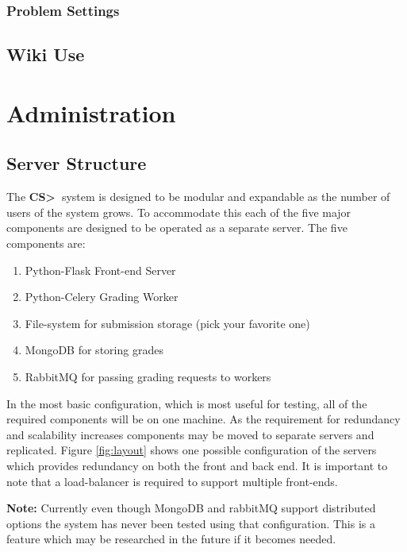 \documentclass[11pt]{report}
\newcommand{\csgt}[0]{\textbf{CS\textgreater\ }}
\begin{document}
\subsection{Problem Settings}




\section{Wiki Use}
\label{sec:wiki}


\chapter{Administration}
\label{ch:admin}
\section{Server Structure}
The \csgt system is designed to be modular and expandable as the number of users of the system grows. 
To accommodate this each of the five major components are designed to be operated as a separate server. 
The five components are:

\begin{enumerate}
\item Python-Flask Front-end Server
\item Python-Celery Grading Worker
\item File-system for submission storage (pick your favorite one)
\item MongoDB for storing grades
\item RabbitMQ for passing grading requests to workers
\end{enumerate}

In the most basic configuration, which is most useful for testing, all of the required components will be 
on one machine. As the requirement for redundancy and scalability increases components may be moved to 
separate servers and replicated. Figure \ref{fig:layout} shows one possible configuration of the servers
which provides redundancy on both the front and back end. It is important to note that a load-balancer is
required to support multiple front-ends.

\textbf{Note:} Currently even though MongoDB and rabbitMQ support distributed options the system has never 
been tested using that configuration. This is a feature which may be researched in the future if it becomes
needed.
\end{document}

